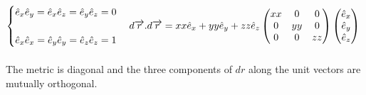 \documentclass[fleqn]{article}
\begin{document}
\begin{enumerate}
{      \\
      $
        \begin{cases}
          \hat{e}_x\hat{e}_y=\hat{e}_x\hat{e}_z=\hat{e}_y\hat{e}_z=0 \\
          \\
          \hat{e}_x\hat{e}_x=\hat{e}_y\hat{e}_y=\hat{e}_z\hat{e}_z=1
        \end{cases} \\
        \\
        \\
        d\overrightarrow{r}.d\overrightarrow{r}=xx\hat{e}_x+yy\hat{e}_y+zz\hat{e}_z \\
        \\
        \\
        \begin{pmatrix}
          xx & 0 & 0 \\
          0 & yy & 0 \\
          0 & 0 & zz
        \end{pmatrix} \begin{pmatrix}
          \hat{e}_x \\
          \hat{e}_y \\
          \hat{e}_z
        \end{pmatrix}
      $ \\
      \\
      The metric is diagonal and the three components of $dr$ along the unit vectors are mutually orthogonal.
    }

    
  \end{enumerate}
\end{document}
